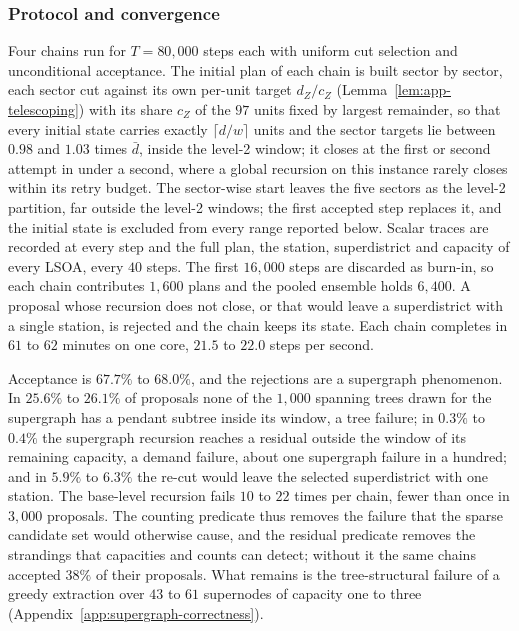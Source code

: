 \documentclass[preprint,12pt,authoryear]{elsarticle}
\theoremstyle{definition}
\begin{document}
\subsubsection{Protocol and convergence}\label{sec:las-protocol}
Four chains run for $T = 80{,}000$ steps each with uniform cut selection and unconditional acceptance. The initial plan of each chain is built sector by sector, each sector cut against its own per-unit target $d_Z / c_Z$ (Lemma~\ref{lem:app-telescoping}) with its share $c_Z$ of the $97$ units fixed by largest remainder, so that every initial state carries exactly $\lceil d/w \rceil$ units and the sector targets lie between $0.98$ and $1.03$ times $\bar d$, inside the level-2 window; it closes at the first or second attempt in under a second, where a global recursion on this instance rarely closes within its retry budget. The sector-wise start leaves the five sectors as the level-2 partition, far outside the level-2 windows; the first accepted step replaces it, and the initial state is excluded from every range reported below. Scalar traces are recorded at every step and the full plan, the station, superdistrict and capacity of every LSOA, every $40$ steps. The first $16{,}000$ steps are discarded as burn-in, so each chain contributes $1{,}600$ plans and the pooled ensemble holds $6{,}400$. A proposal whose recursion does not close, or that would leave a superdistrict with a single station, is rejected and the chain keeps its state. Each chain completes in $61$ to $62$ minutes on one core, $21.5$ to $22.0$ steps per second.

Acceptance is $67.7\%$ to $68.0\%$, and the rejections are a supergraph phenomenon. In $25.6\%$ to $26.1\%$ of proposals none of the $1{,}000$ spanning trees drawn for the supergraph has a pendant subtree inside its window, a tree failure; in $0.3\%$ to $0.4\%$ the supergraph recursion reaches a residual outside the window of its remaining capacity, a demand failure, about one supergraph failure in a hundred; and in $5.9\%$ to $6.3\%$ the re-cut would leave the selected superdistrict with one station. The base-level recursion fails $10$ to $22$ times per chain, fewer than once in $3{,}000$ proposals. The counting predicate thus removes the failure that the sparse candidate set would otherwise cause, and the residual predicate removes the strandings that capacities and counts can detect; without it the same chains accepted $38\%$ of their proposals. What remains is the tree-structural failure of a greedy extraction over $43$ to $61$ supernodes of capacity one to three (Appendix~\ref{app:supergraph-correctness}).
\end{document}

